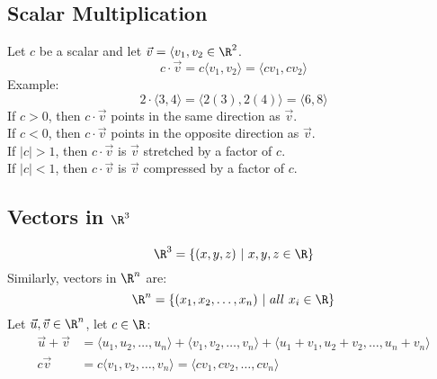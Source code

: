 \documentclass[letterpaper, 12pt]{math}
\begin{document}
\subsection*{Scalar Multiplication}
Let \( c \) be a scalar and let \( \vec{v} = \langle v_{1},v_{2}\in\R^{2} \).
\[ c\cdot\vec{v} = c\langle v_{1},v_{2}\rangle = \langle cv_{1},cv_{2}\rangle \]
Example:
\[ 2\cdot\langle3,4\rangle = \langle2(3),2(4)\rangle = \langle6,8\rangle \]
If \( c>0 \), then \( c\cdot\vec{v} \) points in the same direction as
\( \vec{v} \). \\
If \( c<0 \), then \( c\cdot\vec{v} \) points in the opposite
direction as \( \vec{v} \). \\
If \( |c|>1 \), then \( c\cdot\vec{v} \) is \( \vec{v} \) stretched by a factor
of \( c \). \\
If \( |c|<1 \), then \( c\cdot\vec{v} \) is \( \vec{v} \) compressed by a factor
of \( c \).

\subsection*{Vectors in \( \R^{3} \)}
\[ \R^{3} = \{(x,y,z)\ |\ x,y,z\in\R\} \]
Similarly, vectors in \( \R^{n} \) are:
\[ \R^{n} = \{(x_{1},x_{2},\dots,x_{n})\ |\ all\ x_{i}\in\R\} \]
Let \( \vec{u},\vec{v}\in\R^{n} \), let \( c\in\R \):
\begin{align*}
  \vec{u}+\vec{v} &= \langle u_{1},u_{2},\dots,u_{n}\rangle +
    \langle v_{1},v_{2},\dots,v_{n}\rangle +
    \langle u_{1}+v_{1},u_{2}+v_{2},\dots,u_{n}+v_{n}\rangle \\
  c\vec{v} &= c\langle v_{1},v_{2},\dots,v_{n}\rangle =
    \langle cv_{1},cv_{2},\dots,cv_{n}\rangle
\end{align*}
\end{document}
